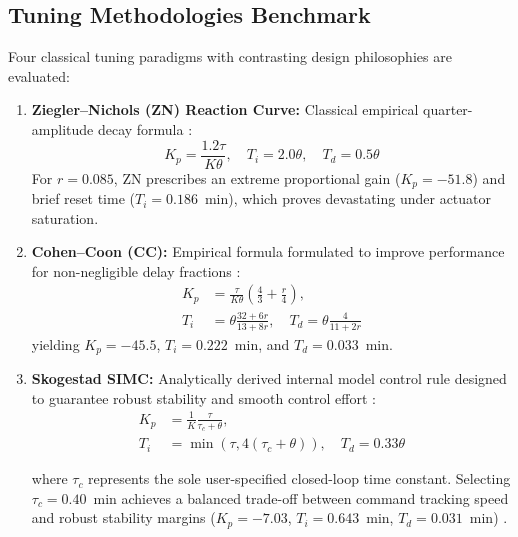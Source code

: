 \subsection{Tuning Methodologies Benchmark}
Four classical tuning paradigms with contrasting design philosophies are evaluated:
\begin{enumerate}
    \item \textbf{Ziegler--Nichols (ZN) Reaction Curve:} Classical empirical quarter-amplitude decay formula \cite{ziegler1942optimum}:
    \begin{equation}
        K_p = \frac{1.2 \tau}{K \theta}, \quad T_i = 2.0 \theta, \quad T_d = 0.5 \theta
    \end{equation}
    For $r = 0.085$, ZN prescribes an extreme proportional gain ($K_p = -51.8$) and brief reset time ($T_i = 0.186$~min), which proves devastating under actuator saturation.
    
    \item \textbf{Cohen--Coon (CC):} Empirical formula formulated to improve performance for non-negligible delay fractions \cite{cohen1953theoretical}:
    \begin{align}
        K_p &= \frac{\tau}{K \theta}\left(\frac{4}{3} + \frac{r}{4}\right), \\
        T_i &= \theta \frac{32 + 6r}{13 + 8r}, \quad T_d = \theta \frac{4}{11 + 2r}
    \end{align}
    yielding $K_p = -45.5$, $T_i = 0.222$~min, and $T_d = 0.033$~min.

    \item \textbf{Skogestad SIMC:} Analytically derived internal model control rule designed to guarantee robust stability and smooth control effort \cite{skogestad2003simple, grimholt2018optimal}:
    \begin{align}
        K_p &= \frac{1}{K}\frac{\tau}{\tau_c + \theta}, \nonumber \\
        T_i &= \min\left(\tau, 4(\tau_c + \theta)\right), \quad T_d = 0.33\theta
        \label{eq:simc_formula}
    \end{align}

    where $\tau_c$ represents the sole user-specified closed-loop time constant. Selecting $\tau_c = 0.40$~min achieves a balanced trade-off between command tracking speed and robust stability margins ($K_p = -7.03$, $T_i = 0.643$~min, $T_d = 0.031$~min) \cite{alcantara2013simple}.
    

\end{enumerate}

